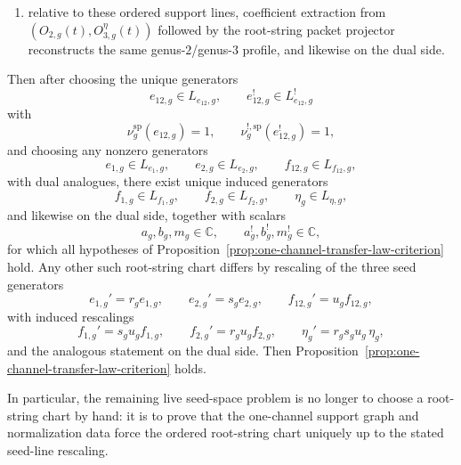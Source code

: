 \begin{proposition}
\begin{enumerate}[label=\textup{(\roman*)}]
  $L_{e_{12},g}\oplus L_{f_1,g}\oplus L_{f_2,g}$ and genus-$3$
  support exactly~$L_{\eta,g}$, with the same support profile on the
  dual side;
\item relative to these ordered support lines, coefficient extraction
  from $(O_{2,g}(t),O_{3,g}^\eta(t))$ followed by the root-string
  packet projector reconstructs the same genus-$2$/genus-$3$ profile,
  and likewise on the dual side.
\end{enumerate}
Then after choosing the unique generators
\[
e_{12,g}\in L_{e_{12},g},
\qquad
e_{12,g}^!\in L_{e_{12},g}^!
\]
with
\[
\nu_g^{\mathrm{sp}}(e_{12,g})=1,
\qquad
\nu_g^{!,\mathrm{sp}}(e_{12,g}^!)=1,
\]
and choosing any nonzero generators
\[
e_{1,g}\in L_{e_1,g},
\qquad
e_{2,g}\in L_{e_2,g},
\qquad
f_{12,g}\in L_{f_{12},g},
\]
with dual analogues, there exist unique induced generators
\[
f_{1,g}\in L_{f_1,g},
\qquad
f_{2,g}\in L_{f_2,g},
\qquad
\eta_g\in L_{\eta,g},
\]
and likewise on the dual side, together with scalars
\[
a_g,b_g,m_g\in\mathbb{C},
\qquad
a_g^!,b_g^!,m_g^!\in\mathbb{C},
\]
for which all hypotheses of
Proposition~\ref{prop:one-channel-transfer-law-criterion} hold.
Any other such root-string chart differs by rescaling of the
three seed generators
\[
e_{1,g}'=r_g e_{1,g},
\qquad
e_{2,g}'=s_g e_{2,g},
\qquad
f_{12,g}'=u_g f_{12,g},
\]
with induced rescalings
\[
f_{1,g}'=s_g u_g f_{1,g},
\qquad
f_{2,g}'=r_g u_g f_{2,g},
\qquad
\eta_g'=r_g s_g u_g\,\eta_g,
\]
and the analogous statement on the dual side.
Then Proposition~\ref{prop:one-channel-transfer-law-criterion} holds.

In particular, the remaining live seed-space problem is no longer to
choose a root-string chart by hand: it is to prove that the one-channel
support graph and normalization data force the ordered root-string chart
uniquely up to the stated seed-line rescaling.
\end{proposition}

